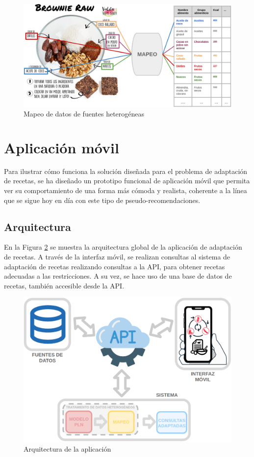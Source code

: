\begin{figure}[H]
    \centering
    \includegraphics[width=1.0\textwidth]{imagenes/app/MAPEO ENTRE DATOS.png}
    \caption{Mapeo de datos de fuentes heterogéneas}
    \label{fig:mapping-entre-recetas-1}
\end{figure}


\section{Aplicación móvil}
Para ilustrar cómo funciona la solución diseñada para el problema de adaptación de recetas, se ha diseñado un prototipo funcional de aplicación móvil que permita ver su comportamiento de una forma más cómoda y realista, coherente a la línea que se sigue hoy en día con este tipo de pseudo-recomendaciones.


\subsection{Arquitectura}

En la Figura \ref{fig:arquitectura-app} se muestra la arquitectura global de la aplicación de adaptación de recetas. A través de la interfaz móvil, se realizan consultas al sistema de adaptación de recetas realizando consultas a la API, para obtener recetas adecuadas a las restricciones. A su vez, se hace uso de una base de datos de recetas, también accesible desde la API.

\begin{figure}[H]
    \centering
    \includegraphics[width=1.0\textwidth]{imagenes/app/arq.png}
    \caption{Arquitectura de la aplicación}
    \label{fig:arquitectura-app}
\end{figure}

